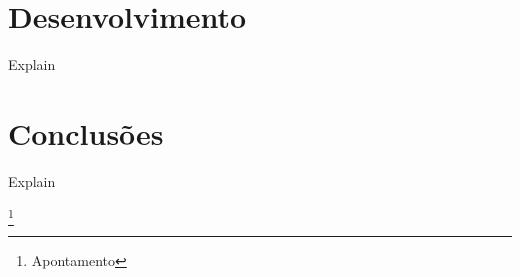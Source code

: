 














\newpage
\section{Desenvolvimento}
\qquad Explain
\newpage
\section{Conclusões}
\qquad Explain
\newpage
\listoffigures
\cite{*}

\newpage
\footnote{Apontamento}

\begin{comment}

\end{comment}
